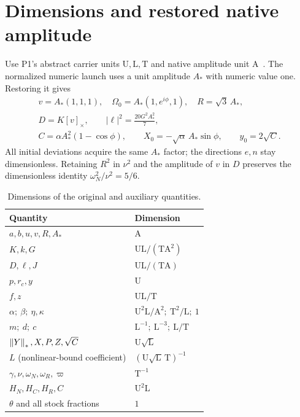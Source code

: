 \section{Dimensions and restored native amplitude}\label{sec:units}
Use P1's abstract carrier units $\mathrm U,\mathrm L,\mathrm T$ and native amplitude unit $\mathrm A$~\cite{p1,p4}. The normalized numeric launch uses a unit amplitude $A_*$ with numeric value one. Restoring it gives
\begin{equation}\label{eq:amplitude}%
\begin{gathered}
 v=A_*(1,1,1),\quad \Omega_0=A_*(1,e^{i\phi},1),\quad R=\sqrt3\,A_*,\\
 D=K[v]_\times,\qquad |\ell|^2=\frac{20G^2A_*^2}{7},\\
 C=\alpha A_*^2(1-\cos\phi),\qquad
 X_0=-\sqrt\alpha\,A_*\sin\phi,\qquad y_0=2\sqrt C .
\end{gathered}
\end{equation}
All initial deviations acquire the same $A_*$ factor; the directions $e,n$ stay dimensionless. Retaining $R^2$ in $\nu^2$ and the amplitude of $v$ in $D$ preserves the dimensionless identity $\omega_N^2/\nu^2=5/6$.

\begin{table}[ht]
\centering
\caption{Dimensions of the original and auxiliary quantities.}\label{tab:units}
\renewcommand{\arraystretch}{1.16}
\begin{tabularx}{\textwidth}{@{}lY@{}}
\toprule
Quantity & Dimension\\\midrule
$a,b,u,v,R,A_*$ & $\mathrm A$\\
$K,k,G$ & $\mathrm U\mathrm L/(\mathrm T\mathrm A^2)$\\
$D,\ell,J$ & $\mathrm U\mathrm L/(\mathrm T\mathrm A)$\\
$p,r_c,y$ & $\mathrm U$\\
$f,z$ & $\mathrm U\mathrm L/\mathrm T$\\
$\alpha;\ \beta;\ \eta,\kappa$ & $\mathrm U^2\mathrm L/\mathrm A^2;\ \mathrm T^2/\mathrm L;\ 1$\\
$m;\ d;\ c$ & $\mathrm L^{-1};\ \mathrm L^{-3};\ \mathrm L/\mathrm T$\\
$\left\|Y\right\|_*,X,P,Z,\sqrt C$ & $\mathrm U\sqrt{\mathrm L}$\\
$L$ (nonlinear-bound coefficient) & $(\mathrm U\sqrt{\mathrm L}\,\mathrm T)^{-1}$\\
$\gamma,\nu,\omega_N,\omega_R,\varpi$ & $\mathrm T^{-1}$\\
$H_N,H_C,H_R,C$ & $\mathrm U^2\mathrm L$\\
$\theta$ and all stock fractions & $1$\\\bottomrule
\end{tabularx}
\end{table}

